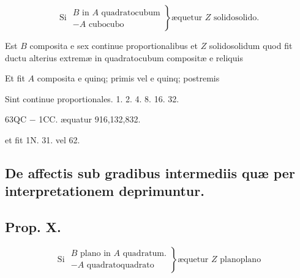 \documentclass[11pt,a4paper]{article}
\begin{document}
\[ \text{Si } \left.\begin{array}{l} B \text{ in } A \text{ quadratocubum} \\ - A \text{ cubocubo} \end{array}\right\} \text{æquetur } Z \text{ solidosolido.} \]

Est $B$ composita e sex continue proportionalibus et $Z$ solidosolidum quod fit ductu alterius extremæ in quadratocubum compositæ e reliquis

Et fit $A$ composita e quinq; primis vel e quinq; postremis

Sint continue proportionales. 1. 2. 4. 8. 16. 32.

63QC $-$ 1CC. æquatur 916,132,832.

et fit 1N. 31. vel 62.

\subsection*{De affectis sub gradibus intermediis quæ per interpretationem deprimuntur.}

\subsection*{Prop. X.}

\[ \text{Si } \left.\begin{array}{l} B \text{ plano in } A \text{ quadratum.} \\ - A \text{ quadratoquadrato} \end{array}\right\} \text{æquetur } Z \text{ planoplano} \]
\end{document}
